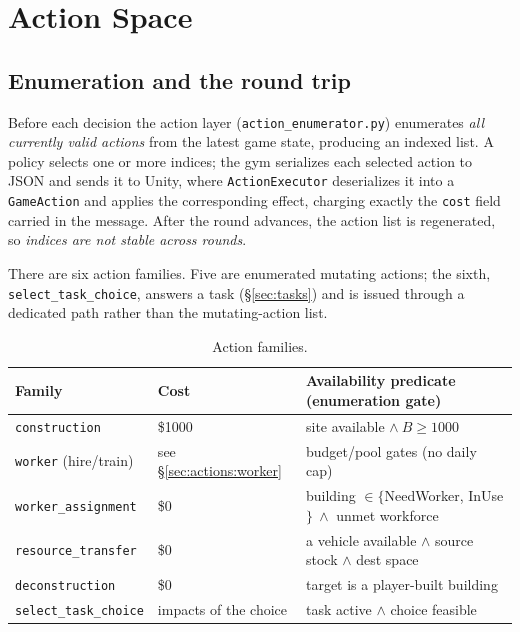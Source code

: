 \documentclass[11pt]{article}
\newcommand{\code}[1]{\texttt{\small #1}}
\newcommand{\file}[1]{\textcolor{blue!40!black}{\texttt{\footnotesize #1}}}
\begin{document}
\section{Action Space}
\label{sec:actions}

\subsection{Enumeration and the round trip}
Before each decision the action layer (\file{action\_enumerator.py}) enumerates
\emph{all currently valid actions} from the latest game state, producing an
indexed list. A policy selects one or more indices; the gym serializes each
selected action to JSON and sends it to Unity, where \code{ActionExecutor}
deserializes it into a \code{GameAction} and applies the corresponding effect,
charging exactly the \code{cost} field carried in the message. After the round
advances, the action list is regenerated, so \emph{indices are not stable across
rounds}.

There are six action families. Five are enumerated mutating actions; the sixth,
\code{select\_task\_choice}, answers a task (\S\ref{sec:tasks}) and is issued
through a dedicated path rather than the mutating-action list.

\begin{table}[h]
\centering\small
\begin{tabular}{@{}lll@{}}
\toprule
Family & Cost & Availability predicate (enumeration gate) \\
\midrule
\code{construction}       & \$1000 & site available $\wedge\ B \geq 1000$ \\
\code{worker} (hire/train) & see \S\ref{sec:actions:worker} & budget/pool gates (no daily cap) \\
\code{worker\_assignment} & \$0 & building $\in\{$NeedWorker, InUse$\}\ \wedge$ unmet workforce \\
\code{resource\_transfer} & \$0 & a vehicle available $\wedge$ source stock $\wedge$ dest space \\
\code{deconstruction}     & \$0 & target is a player-built building \\
\code{select\_task\_choice} & impacts of the choice & task active $\wedge$ choice feasible \\
\bottomrule
\end{tabular}
\caption{Action families.}
\label{tab:actions}
\end{table}
\end{document}
